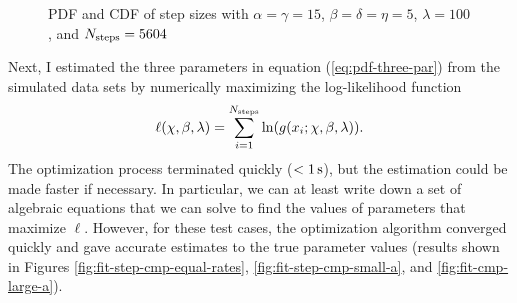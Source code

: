 \documentclass{article}
\newcommand{\tn}{\textnormal}
\begin{document}
\begin{figure}
  \centering
  \begin{subfigure}{0.48\textwidth}
  \end{subfigure}
  \hfill
  \begin{subfigure}{0.48\textwidth}
  \end{subfigure}
  \caption{PDF and CDF of step sizes with $\alpha = \gamma = 15$,
    $\beta = \delta = \eta = 5$, $\lambda = 100$, and $N_\tn{steps} =
    5604$}
  \label{fig:exact-step-cmp-large-a}  
\end{figure}

Next, I estimated the three parameters in equation
(\ref{eq:pdf-three-par}) from the simulated data sets by numerically
maximizing the log-likelihood function
\begin{equation*}
  \ell(\chi, \beta, \lambda) = \sum_{i=1}^{N_\tn{steps}} \ln(g(x_i;
  \chi, \beta, \lambda)).
\end{equation*}
The optimization process terminated quickly ($< 1\,\tn{s}$), but the
estimation could be made faster if necessary. In particular, we can at
least write down a set of algebraic equations that we can solve to
find the values of parameters that maximize $\ell$. However, for these
test cases, the optimization algorithm converged quickly and gave
accurate estimates to the true parameter values (results shown in
Figures \ref{fig:fit-step-cmp-equal-rates},
\ref{fig:fit-step-cmp-small-a}, and \ref{fig:fit-cmp-large-a}).
\end{document}
